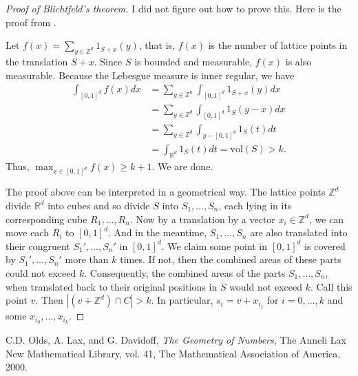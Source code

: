 \documentclass[12pt,reqno]{amsart}
\theoremstyle{definition}
\newcommand{\ZZ}{\mathbb{Z}}
\newcommand{\RR}{\mathbb{R}}
\newcommand{\vol}[1]{\mathrm{vol}(#1)}
\begin{document}
\begin{proof}[Proof of Blichtfeld's theorem]

  I did not figure out how to prove this. Here is the proof from \cite{old}.


  Let $f(x)=\sum_{y\in \ZZ^d} 1_{S+x}(y)$, that is, $f(x)$ is the number of lattice points in the translation $S+x$. Since $S$ is bounded and measurable, $f(x)$ is also measurable. Because the Lebesgue measure is inner regular, we have
  \begin{align*}
    \int_{[0,1]^d} f(x) dx & =\sum_{y\in\ZZ^n} \int_{[0,1]^d} 1_{S+x}(y)dx  \\
                           & = \sum_{y\in\ZZ^d} \int_{[0,1]^d} 1_{S}(y-x)dx \\
                           & = \sum_{y\in\ZZ^d} \int_{y-[0,1]^d} 1_{S}(t)dt \\
                           & =\int_{\RR^d} 1_{S}(t)dt = \vol{S} >k.
  \end{align*}
  Thus, $\max_{x\in [0,1]^d} f(x) \geq k+1$. We are done.

  The proof above can be interpreted in a geometrical way. The lattice points $\ZZ^d$ divide $\RR^d$ into cubes and so divide $S$ into $S_1,\dots,S_n$, each lying in its corresponding cube $R_1,\dots,R_n$. Now by a translation by a vector $x_i \in \ZZ^d$, we can move each $R_i$ to $[0,1]^d$. And in the meantime, $S_1,\dots,S_n$ are also translated into their congruent $S_1',\dots,S_n'$ in $[0,1]^d$. We claim some point in $[0,1]^d$ is covered by $S_1',\dots,S_n'$ more than $k$ times. If not, then the combined areas of these parts could not exceed $k$. Consequently, the combined areas  of the parts $S_1,\dots,S_n$, when translated back to their original positions in $S$ would not exceed $k$. Call this point $v$. Then $|(v+\ZZ^d)\cap C| >k$. In particular, $s_i=v+x_{i_j}$ for $i=0,\dots,k$ and some $x_{i_0},\dots, x_{i_k}$.
\end{proof}


\begin{thebibliography}{9}
  C.D. Olds, A. Lax, and G. Davidoff, \emph{The Geometry of Numbers}, The Anneli Lax New Mathematical Library, vol. 41, The Mathematical Association of America, 2000.
\end{thebibliography}
\end{document}
